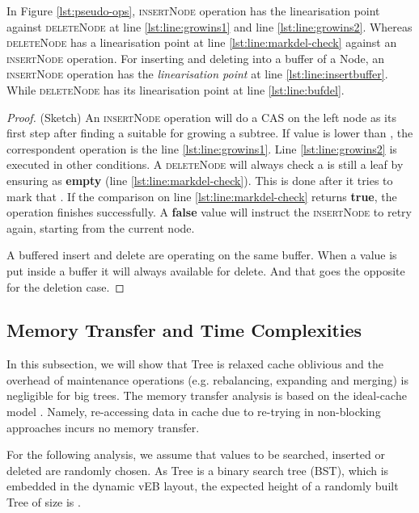 \begin{lemma} 
In Figure \ref{lst:pseudo-ops}, \textsc{insertNode} operation has the linearisation 
point against \textsc{deleteNode} at line \ref{lst:line:growins1} and line \ref{lst:line:growins2}. 
Whereas \textsc{deleteNode} has a linearisation point at line \ref{lst:line:markdel-check}
against an \textsc{insertNode} operation. 
For inserting and deleting into a buffer of a Node, an \textsc{insertNode} 
operation has the \textit{linearisation point} at line \ref{lst:line:insertbuffer}. While
\textsc{deleteNode} has its linearisation point at line \ref{lst:line:bufdel}.
\label{lem:linear-ins-del}
\end{lemma}
\begin{proof}(Sketch) An \textsc{insertNode} operation will do a \textsc{CAS} on the left node
as its first step after finding a suitable  for growing a subtree. If value 
is lower than  , the correspondent operation is the line \ref{lst:line:growins1}.
Line \ref{lst:line:growins2} is executed in other conditions. A \textsc{deleteNode} will always
check a  is still a leaf by ensuring  as \textbf{empty}
(line \ref{lst:line:markdel-check}). This is done after it tries to mark that . If the comparison
on line \ref{lst:line:markdel-check} returns \textbf{true}, the operation finishes successfully.
A \textbf{false} value will instruct the \textsc{insertNode} to retry again, starting from
the current node.

A buffered insert and delete are operating on the same buffer. When a value  is put inside
a buffer it will always available for delete. And that goes the opposite for the deletion case.  
\end{proof}


\subsection{Memory Transfer and Time Complexities} 
 
In this subsection, we will show that Tree is relaxed cache oblivious
and the overhead of maintenance operations (e.g. rebalancing, expanding and
merging) is negligible for big trees. The memory transfer analysis is based on
the ideal-cache model \cite{Frigo:1999:CA:795665.796479}. Namely, re-accessing
data in cache due to re-trying in non-blocking approaches incurs no memory
transfer.

For the following analysis, we assume that values to be searched, inserted or
deleted are randomly chosen. As Tree is a binary search tree (BST),
which is embedded in the dynamic vEB layout, the expected height of a randomly
built Tree of size  is  \cite{CormenSRL01}.


